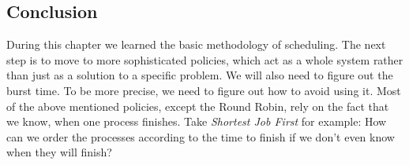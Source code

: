  \subsection{Conclusion}

During this chapter we learned the basic methodology of scheduling.
The next step is to move to more sophisticated policies, which act as a whole system rather than just as a solution to a specific problem.
We will also need to figure out the burst time.
To be more precise, we need to figure out how to avoid using it.
Most of the above mentioned policies, except the Round Robin, rely on the fact that we know, when one process finishes.
Take \emph{Shortest Job First} for example: How can we order the processes according to the time to finish if we don't even know when they will finish?
